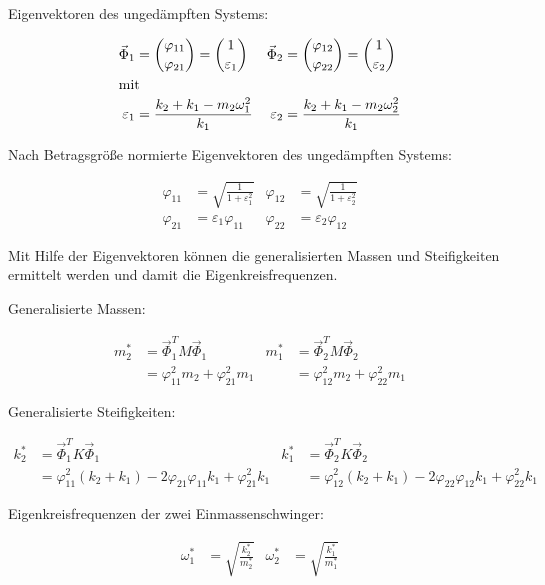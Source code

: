 Eigenvektoren des ungedämpften Systems:

\begin{align*}
\vec{\Phi}_1 &= \binom{\varphi_{11}}{\varphi_{21}} = \binom{1}{\varepsilon_1} & \vec{\Phi}_2 &= \binom{\varphi_{12}}{\varphi_{22}} = \binom{1}{\varepsilon_2}\\
\intertext{mit}
\varepsilon_1 &= \frac{k_2 + k_1 - m_2 \omega_1^2}{k_1} & \varepsilon_2 &= \frac{k_2 + k_1 - m_2 \omega_2^2}{k_1}
\end{align*}

Nach Betragsgröße normierte Eigenvektoren des ungedämpften Systems:

\begin{align*}
\varphi_{11} &= \sqrt{\frac{1}{1 + \varepsilon_1^2}}  &  \varphi_{12} &= \sqrt{\frac{1}{1 + \varepsilon_2^2}}\\
\varphi_{21} &= \varepsilon_1 \varphi_{11}            &  \varphi_{22} &= \varepsilon_2 \varphi_{12}
\end{align*}

Mit Hilfe der Eigenvektoren können die generalisierten Massen und Steifigkeiten ermittelt werden und damit die Eigenkreisfrequenzen.

Generalisierte Massen:

\begin{align*}
m_2^* &= \vec{\Phi}_1^T M \vec{\Phi}_1               &   m_1^* &= \vec{\Phi}_2^T M \vec{\Phi}_2\\
      &= \varphi_{11}^2 m_2 + \varphi_{21}^2 m_1     &         &= \varphi_{12}^2 m_2 + \varphi_{22}^2 m_1
\end{align*}

Generalisierte Steifigkeiten:

\begin{align*}
k_2^* &= \vec{\Phi}_1^T K \vec{\Phi}_1                                                          &   k_1^* &= \vec{\Phi}_2^T K \vec{\Phi}_2\\
      &= \varphi_{11}^2 (k_2 + k_1) - 2 \varphi_{21} \varphi_{11} k_1 + \varphi_{21}^2 k_1      &         &= \varphi_{12}^2 (k_2 + k_1) - 2 \varphi_{22} \varphi_{12} k_1 + \varphi_{22}^2 k_1
\end{align*}

Eigenkreisfrequenzen der zwei Einmassenschwinger:

\begin{align*}
\omega_1^* &= \sqrt{\frac{k_2^*}{m_2^*}}  &  \omega_2^* &= \sqrt{\frac{k_1^*}{m_1^*}}
\end{align*}

